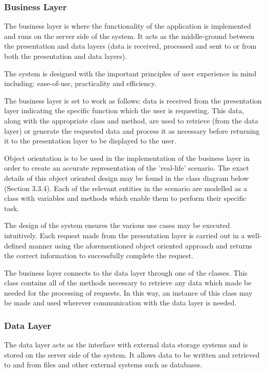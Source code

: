 \documentclass{article}
\begin{document}
\subsubsection{Business Layer}
The business layer is where the functionality of the application is implemented and runs on the server side of the system. It acts as the middle-ground between the presentation and data layers (data is received, processed and sent to or from both the presentation and data layers).

The system is designed with the important principles of user experience in mind including: ease-of-use, practicality and efficiency.

The business layer is set to work as follows: data is received from the presentation layer indicating the specific function which the user is requesting. This data, along with the appropriate class and method, are used to retrieve (from the data layer) or generate the requested data and process it as necessary before returning it to the presentation layer to be displayed to the user.

Object orientation is to be used in the implementation of the business layer in order to create an accurate representation of the 'real-life' scenario. The exact details of this object oriented design may be found in the class diagram below (Section 3.3.4). Each of the relevant entities in the scenario are modelled as a class with variables and methods which enable them to perform their specific task.

The design of the system ensures the various use cases may be executed intuitively. Each request made from the presentation layer is carried out in a well-defined manner using the aforementioned object oriented approach and returns the correct information to successfully complete the request.

The business layer connects to the data layer through one of the classes. This class contains all of the methods necessary to retrieve any data which made be needed for the processing of requests. In this way, an instance of this class may be made and used wherever communication with the data layer is needed.

\subsubsection{Data Layer}
The data layer acts as the interface with external data storage systems and is stored on the server side of the system. It allows data to be written and
retrieved to and from files and other external systems such as databases.
\end{document}
